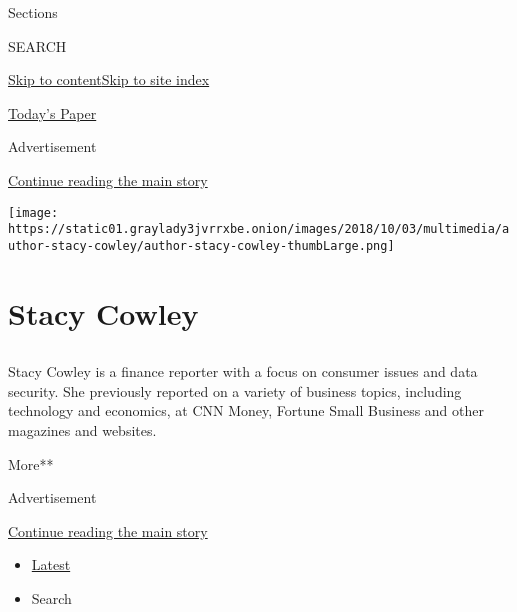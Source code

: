 Sections

SEARCH

\protect\hyperlink{site-content}{Skip to
content}\protect\hyperlink{site-index}{Skip to site index}

\href{https://myaccount.nytimes3xbfgragh.onion/auth/login?response_type=cookie\&client_id=vi}{}

\href{https://www.nytimes3xbfgragh.onion/section/todayspaper}{Today's
Paper}

Advertisement

\protect\hyperlink{after-top}{Continue reading the main story}

\texttt{[image: https://static01.graylady3jvrrxbe.onion/images/2018/10/03/multimedia/author-stacy-cowley/author-stacy-cowley-thumbLarge.png]}

\hypertarget{stacy-cowley}{%
\section{Stacy Cowley}\label{stacy-cowley}}

\subsection{}

Stacy Cowley is a finance reporter with a focus on consumer issues and
data security. She previously reported on a variety of business topics,
including technology and economics, at CNN Money, Fortune Small Business
and other magazines and websites.

More**

Advertisement

\protect\hyperlink{after-mid1}{Continue reading the main story}

\begin{itemize}
\tightlist
\item
  \protect\hyperlink{stream-panel}{Latest}
\item
  Search
\end{itemize}

